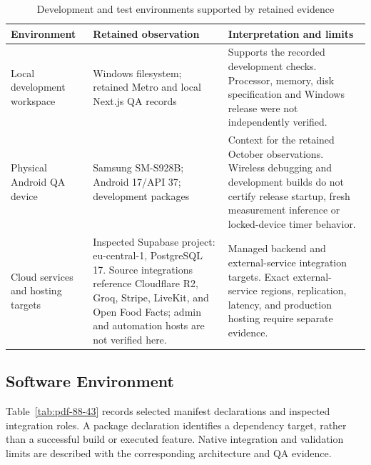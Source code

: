 \documentclass[12pt,a4paper,openany]{report}
\begin{document}
\begingroup
\footnotesize
\setlength{\tabcolsep}{3pt}
\renewcommand{\arraystretch}{1.20}
\setlength{\LTpre}{5pt}
\setlength{\LTpost}{10pt}
\begin{longtable}{|L{3.67cm}|L{5.29cm}|L{5.73cm}|}
\caption{Development and test environments supported by retained evidence}\label{tab:pdf-88-42} \\
\hline
Environment & Retained observation & Interpretation and limits \\ \hline
Local development workspace & Windows filesystem; retained Metro and local Next.js QA records & Supports the recorded development checks. Processor, memory, disk specification and Windows release were not independently verified. \\ \hline
Physical Android QA device & Samsung SM-S928B; Android 17/API 37; development packages & Context for the retained October observations. Wireless debugging and development builds do not certify release startup, fresh measurement inference or locked-device timer behavior. \\ \hline
Cloud services and hosting targets & Inspected Supabase project: eu-central-1, PostgreSQL 17. Source integrations reference Cloudflare R2, Groq, Stripe, LiveKit, and Open Food Facts; admin and automation hosts are not verified here. & Managed backend and external-service integration targets. Exact external-service regions, replication, latency, and production hosting require separate evidence. \\ \hline
\end{longtable}
\endgroup

\subsection{Software Environment}

Table~\ref{tab:pdf-88-43} records selected manifest declarations and inspected integration roles. A package declaration identifies a dependency target, rather than a successful build or executed feature. Native integration and validation limits are described with the corresponding architecture and QA evidence.
\end{document}
